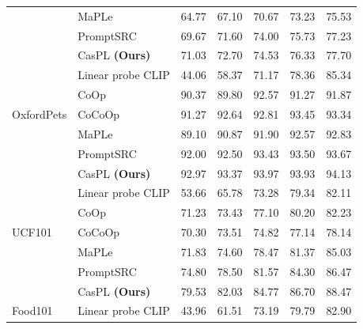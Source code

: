 \begin{table}[t!]
{\begin{tabular}{ll|ccccc}
                                       & MaPLe                  & 64.77	&67.10	&70.67&	73.23&	75.53\\
                                      & PromptSRC                &69.67	&71.60	&74.00	&75.73	&77.23\\
                                      \rowcolor{tablecolor}
                                       & CasPL \textbf{(Ours) }   & 71.03 	&72.70 	&74.53 	&76.33 &77.70      \\
                                       \hline
        \multirow{5}{*}{OxfordPets}    & Linear probe CLIP        & 44.06	&58.37	&71.17	&78.36	&85.34\\
                                       & CoOp                      & 90.37	&89.80	&92.57	&91.27	&91.87\\
                                       & CoCoOp                       & 91.27	&92.64	&92.81	&93.45	&93.34\\
                                       & MaPLe                  & 89.10	&90.87	&91.90&	92.57& 92.83\\
                                       & PromptSRC                   & 92.00	&92.50	&93.43	&93.50	&93.67\\
                                       \rowcolor{tablecolor}
                                        & CasPL \textbf{(Ours) }    & 92.97 	&93.37 	&93.97 &93.93 &94.13     \\
                                       \hline
        \multirow{5}{*}{UCF101}        & Linear probe CLIP        & 53.66	&65.78	&73.28	&79.34&	82.11\\
                                       & CoOp                     & 71.23	&73.43	&77.10	&80.20	&82.23\\
                                       & CoCoOp                   & 70.30	&73.51	&74.82	&77.14&	78.14\\
                                       & MaPLe                  & 71.83	&74.60	& 78.47& 81.37&	85.03\\
                                       & PromptSRC                   & 74.80	&78.50	&81.57	&84.30	&86.47\\
                                       \rowcolor{tablecolor}
                                        & CasPL \textbf{(Ours) }     &79.53 	&82.03 	&84.77 	&86.70 	&88.47      \\
                                       \hline
        \multirow{5}{*}{Food101}       & Linear probe CLIP       & 43.96	&61.51	&73.19	&79.79	&82.90\\

\end{tabular}}
\end{table}
